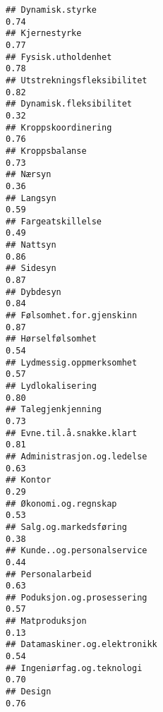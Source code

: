 \documentclass[
]{article}
\begin{document}
\begin{verbatim}
## Dynamisk.styrke                                                                  0.74
## Kjernestyrke                                                                     0.77
## Fysisk.utholdenhet                                                               0.78
## Utstrekningsfleksibilitet                                                        0.82
## Dynamisk.fleksibilitet                                                           0.32
## Kroppskoordinering                                                               0.76
## Kroppsbalanse                                                                    0.73
## Nærsyn                                                                           0.36
## Langsyn                                                                          0.59
## Fargeatskillelse                                                                 0.49
## Nattsyn                                                                          0.86
## Sidesyn                                                                          0.87
## Dybdesyn                                                                         0.84
## Følsomhet.for.gjenskinn                                                          0.87
## Hørselfølsomhet                                                                  0.54
## Lydmessig.oppmerksomhet                                                          0.57
## Lydlokalisering                                                                  0.80
## Talegjenkjenning                                                                 0.73
## Evne.til.å.snakke.klart                                                          0.81
## Administrasjon.og.ledelse                                                        0.63
## Kontor                                                                           0.29
## Økonomi.og.regnskap                                                              0.53
## Salg.og.markedsføring                                                            0.38
## Kunde..og.personalservice                                                        0.44
## Personalarbeid                                                                   0.63
## Poduksjon.og.prosessering                                                        0.57
## Matproduksjon                                                                    0.13
## Datamaskiner.og.elektronikk                                                      0.54
## Ingeniørfag.og.teknologi                                                         0.70
## Design                                                                           0.76

\end{verbatim}
\end{document}
